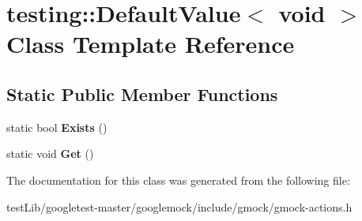 \hypertarget{classtesting_1_1DefaultValue_3_01void_01_4}{}\section{testing\+:\+:Default\+Value$<$ void $>$ Class Template Reference}
\label{classtesting_1_1DefaultValue_3_01void_01_4}
\subsection*{Static Public Member Functions}
\begin{DoxyCompactItemize}
\item 
\mbox{\label{classtesting_1_1DefaultValue_3_01void_01_4_ae18ea46cbf928b820c91f15fa7aa317b}} 
static bool {\bfseries Exists} ()
\item 
\mbox{\label{classtesting_1_1DefaultValue_3_01void_01_4_acda4c367a5b0c0cfb28bc2289f385eed}} 
static void {\bfseries Get} ()
\end{DoxyCompactItemize}


The documentation for this class was generated from the following file\+:\begin{DoxyCompactItemize}
\item 
test\+Lib/googletest-\/master/googlemock/include/gmock/gmock-\/actions.\+h\end{DoxyCompactItemize}
